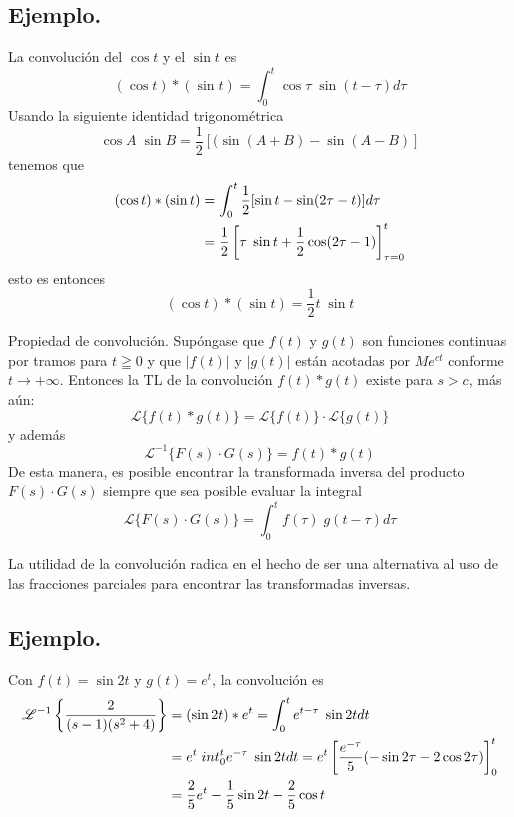 \subsection*{Ejemplo.}
La convolución del $\cos t$ y el $\sin t$ es
\[ (\cos t) * (\sin t) = \int_{0}^{t} \cos \tau	\; \sin (t - \tau) d \tau \]
Usando la siguiente identidad trigonométrica
\[ \cos A \; \sin B =  \frac{1}{2} [ (\sin(A + B) - \sin (A - B) ] \]
tenemos que
\begin{align*}
(\cos t) * (\sin t) &=  \int_{0}^{t} \frac{1}{2} [\sin t - \sin (2 \tau - t)] d \tau \nonumber \\
&= \dfrac{1}{2} \left[ \tau \; \sin t + \dfrac{1}{2} \cos (2 \tau - 1) \right]_{\tau=0}^{t}
\end{align*}
esto es entonces
\[ (\cos t) * (\sin t) = \frac{1}{2} t \; \sin t \]
\begin{teo}{Propiedad de convolución.}
Supóngase que $f(t)$ y $g(t)$ son funciones continuas por tramos para $ t \geqq 0$ y que $\vert f(t) \vert$ y $\vert g(t) \vert$ están acotadas por $M e^{ct}$ conforme $t \to +\infty$. Entonces la TL de la convolución $f(t) * g(t)$ existe para $s > c$, más aún:
\begin{equation}
\mathscr{L} \{ f(t) * g(t) \} = \mathscr{L} \{ f(t) \} \cdot \mathscr{L} \{ g(t) \}
\label{eq:ecuacion_Cap7_004}
\end{equation}
y además
\begin{equation}
\mathscr{L}^{-1} \{ F(s) \cdot G(s) \} = f(t) * g(t)
\label{eq:ecuacion_Cap7_005}
\end{equation}
De esta manera, es posible encontrar la transformada inversa del producto $F(s) \cdot G(s)$ siempre que sea posible evaluar la integral
\begin{equation}
\mathscr{L} \{ F(s) \cdot G(s) \} = \int_{0}^{t} f(\tau) \; g(t - \tau) d \tau
\label{eq:ecuacion_Cap7_005b}
\end{equation}
\end{teo}
La utilidad de la convolución radica en el hecho de ser una alternativa al uso de las fracciones parciales para encontrar las transformadas inversas.
\subsection*{Ejemplo.}
Con $f(t) = \sin 2t$ y $g(t) = e^{t}$, la convolución es
\begin{align*}
\mathscr{L}^{-1} \left\lbrace \dfrac{2}{(s-1)(s^{2} + 4)} \right\rbrace &= (\sin 2t) * e^{t} = \int_{0}^{t} e^{t - \tau} \; \sin 2t dt \nonumber \\
&= e^{t} \; int_{0}^{t} e^{-\tau} \; \sin 2t dt = e^{t} \left[ \dfrac{e^{-\tau}}{5} (- \sin 2 \tau - 2 \cos 2 \tau) \right]_{0}^{t} \nonumber \\
&= \dfrac{2}{5} e^{t} - \dfrac{1}{5} \sin 2t - \dfrac{2}{5} \cos t
\end{align*}


